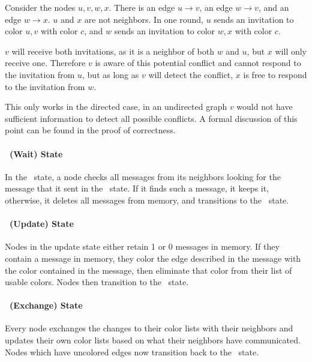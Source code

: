 Consider the nodes $u,v,w,x$. There is an edge $u \to v$, an edge $w \to v$, and an edge $w \to x$. $u$ and $x$ are not neighbors. In one round, $u$ sends an invitation to color $u, v$ with color $c$, and $w$ sends an invitation to color $w,x$ with color $c$. 

$v$ will receive both invitations, as it is a neighbor of both $w$ and $u$, but $x$ will only receive one. Therefore $v$ is aware of this potential conflict and cannot respond to the invitation from $u$, but as long as $v$ will detect the conflict, $x$ is free to respond to the invitation from $w$. 

This only works in the directed case, in an undirected graph $v$ would not have sufficient information to detect all possible conflicts. A formal discussion of this point can be found in the proof of correctness.

\paragraph{\cWd\ (Wait) State}
In the \cWd\ state, a node checks all messages from its neighbors looking for the message that it sent in the \cId\ state. If it finds such a message, it keeps it, otherwise, it deletes all messages from memory, and transitions to the \cUd\ state.

\paragraph{\cUd\ (Update) State}
Nodes in the update state either retain 1 or 0 messages in memory. If they contain a message in memory, they color the edge described in the message with the color contained in the message, then eliminate that color from their list of usable colors. Nodes then transition to the \cEd\ state.

\paragraph{\cEd\ (Exchange) State}
Every node exchanges the changes to their color lists with their neighbors and updates their own color lists based on what their neighbors have communicated. Nodes which have uncolored edges now transition back to the \cCd\ state.
